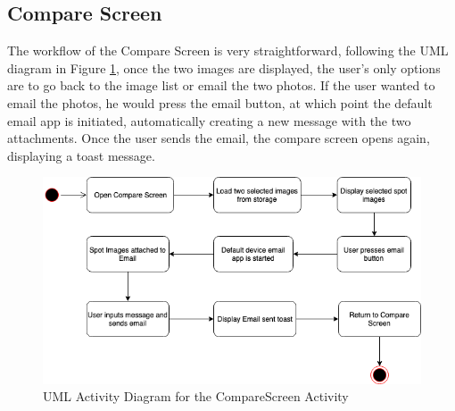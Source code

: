 \subsection{Compare Screen}
The workflow of the Compare Screen is very straightforward, following the UML diagram in Figure \ref{fig:CompareScreen}, once the two images are displayed, the user's only options are to go back to the image list or email the two photos. If the user wanted to email the photos, he would press the email button, at which point the default email app is initiated, automatically creating a new message with the two attachments. Once the user sends the email, the compare screen opens again, displaying a toast message.

\begin{figure}
    \includegraphics[width=1.2\textwidth, center]{figures/CompareScreen.png}
    \caption{UML Activity Diagram for the CompareScreen Activity}
    \label{fig:CompareScreen}
\end{figure}

